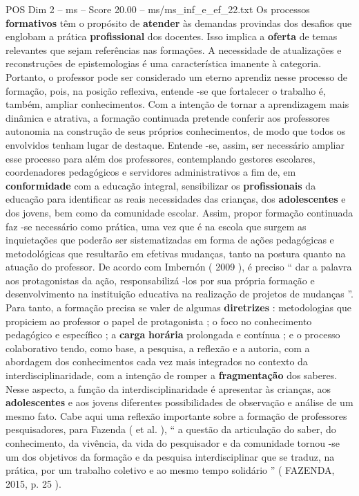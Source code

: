 \begin{textsample}{POS Dim 2 – ms – Score 20.00 – ms/ms\_inf\_e\_ef\_22.txt}
Os processos \textbf{formativos} têm o propósito de \textbf{atender} às demandas provindas dos desafios que englobam a prática \textbf{profissional} dos docentes.
Isso implica a \textbf{oferta} de temas relevantes que sejam referências nas formações.
A necessidade de atualizações e reconstruções de epistemologias é uma característica imanente à categoria.
Portanto, o professor pode ser considerado um eterno aprendiz nesse processo de formação, pois, na posição reflexiva, entende -se que fortalecer o trabalho é, também, ampliar conhecimentos.
Com a intenção de tornar a aprendizagem mais dinâmica e atrativa, a formação continuada pretende conferir aos professores autonomia na construção de seus próprios conhecimentos, de modo que todos os envolvidos tenham lugar de destaque.
Entende -se, assim, ser necessário ampliar esse processo para além dos professores, contemplando gestores escolares, coordenadores pedagógicos e servidores administrativos a fim de, em \textbf{conformidade} com a educação integral, sensibilizar os \textbf{profissionais} da educação para identificar as reais necessidades das crianças, dos \textbf{adolescentes} e dos jovens, bem como da comunidade escolar.
Assim, propor formação continuada faz -se necessário como prática, uma vez que é na escola que surgem as inquietações que poderão ser sistematizadas em forma de ações pedagógicas e metodológicas que resultarão em efetivas mudanças, tanto na postura quanto na atuação do professor.
De acordo com Imbernón ( 2009 ), é preciso “ dar a palavra aos protagonistas da ação, responsabilizá -los por sua própria formação e desenvolvimento na instituição educativa na realização de projetos de mudanças ”.
Para tanto, a formação precisa se valer de algumas \textbf{diretrizes} : metodologias que propiciem ao professor o papel de protagonista ; o foco no conhecimento pedagógico e específico ; a \textbf{carga} \textbf{horária} prolongada e contínua ; e o processo colaborativo tendo, como base, a pesquisa, a reflexão e a autoria, com a abordagem dos conhecimentos cada vez mais integrados no contexto da interdisciplinaridade, com a intenção de romper a \textbf{fragmentação} dos saberes.
Nesse aspecto, a função da interdisciplinaridade é apresentar às crianças, aos \textbf{adolescentes} e aos jovens diferentes possibilidades de observação e análise de um mesmo fato.
Cabe aqui uma reflexão importante sobre a formação de professores pesquisadores, para Fazenda ( et al. ), “ a questão da articulação do saber, do conhecimento, da vivência, da vida do pesquisador e da comunidade tornou -se um dos objetivos da formação e da pesquisa interdisciplinar que se traduz, na prática, por um trabalho coletivo e ao mesmo tempo solidário ” ( FAZENDA, 2015, p. 25 ).

\end{textsample}
